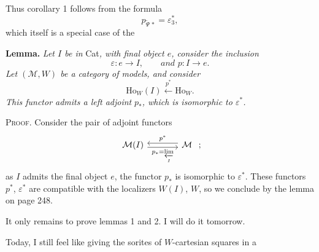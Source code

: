 \documentclass[11pt]{article}
\newcommand{\printedpage}[1]{\marginpar{\footnotesize p.~#1}}
\newcommand{\msp}[1]{\marginpar{\footnotesize [#1]}}
\newcommand{\Ho}{\mathrm{Ho}}
\begin{document}
\msp{page 257}
Thus corollary 1 follows from the formula
\[
p_{\tilde{\Psi}\,*}=\varepsilon_3^*,
\]
which itself is a special case of the

\printedpage{167}

\textbf{Lemma.} \textit{Let $I$ be in} Cat\textit{, with final object $e$, consider the inclusion}
\[
\varepsilon : e\longrightarrow I,\qquad \textit{and } p : I\longrightarrow e.
\]
\textit{Let $(\mathcal{M},W)$ be a category of models, and consider}
\[
\Ho_W(I)\xleftarrow{\ p^*\ }\Ho_W.
\]
\textit{This functor admits a left adjoint} \textit{$p_*$, which is isomorphic to $\varepsilon^*$.}

\textsc{Proof}. Consider the pair of adjoint functors
\[
\begin{tikzcd}[ampersand replacement=\&, column sep=large]
\mathcal{M}(I) \arrow[r, shift right, "p_*=\varprojlim\limits_I"'] \& \mathcal{M} \arrow[l, shift right, "p^*"']
\end{tikzcd}\ ;
\]
as $I$ admits the final object $e$, the functor $p_*$ is isomorphic to $\varepsilon^*$. These functors $p^*$, $\varepsilon^*$ are compatible with the localizers $W(I)$, $W$, so we conclude by the lemma on page 248.

It only remains to prove lemmas 1 and 2. I will do it tomorrow.

\msp{page 258}
Today, I still feel like giving the sorites of $W$-cartesian squares in a
\end{document}
